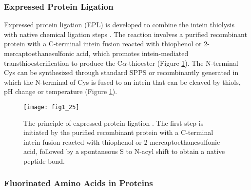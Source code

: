 \begin{refsection}
\subsubsection{Expressed Protein Ligation}

Expressed protein ligation (EPL) is developed to combine the intein
thiolysis with native chemical ligation steps \cite{Muir2003}. The reaction
involves a purified recombinant protein with a C-terminal intein fusion
reacted with thiophenol or 2-mercaptoethanesulfonic acid, which promotes
intein-mediated transthioesterification to produce the C$\alpha$-thioester
(Figure \ref{fig:epl-intro}). The N-terminal Cys can be synthesized
through standard SPPS or recombinantly generated in which the N-terminal of Cys
is fused to an intein that can be cleaved by thiols, pH change or temperature
\cite{Muir1998,Theato2013} (Figure \ref{fig:epl-intro}). 
\begin{figure}[htbp] \centering \texttt{[image: fig1\_25]}
    \caption[The principle of expressed protein ligation. The first step
        involves the purified recombinant protein with a C-terminal intein
        fusion reacted with thiophenol or 2-mercaptoethanesulfonic acid, which
        promotes intein mediated transthioesterification to produce the
        C$\alpha$-thioester. The N-terminal Cys can be synthesized through
        standard SPPS or recombinantly generated in which the N-terminal of Cys
        is fused to an intein that can be cleaved by thiols, pH change or
    temperature.]{The principle of expressed protein ligation
        \cite{Muir1998,Theato2013}. The first step is initiated by the purified
        recombinant protein with a C-terminal intein fusion reacted with
        thiophenol or 2-mercaptoethanesulfonic acid, followed by a spontaneous
    S to N-acyl shift to obtain a native peptide bond.} \label{fig:epl-intro}
\end{figure}

\subsubsection{Fluorinated Amino Acids in Proteins} 
\label{sec:faa-intro}


\end{refsection}
